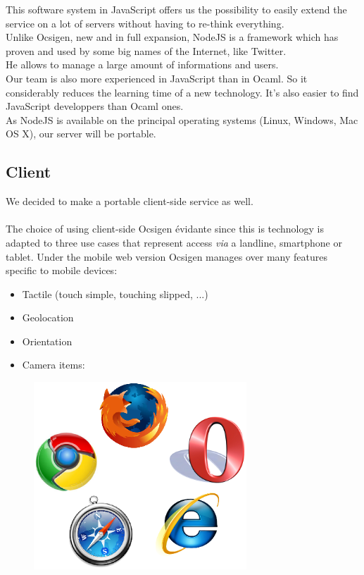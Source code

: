 \documentclass {life-en}
\begin{document}
This software system in JavaScript offers us the possibility to easily extend the service on a lot of servers without having to re-think everything.\\

Unlike Ocsigen, new and in full expansion, NodeJS is a framework which has proven and used by some big names of the Internet, like Twitter.\\
He allows to manage a large amount of informations and users.\\

Our team is also more experienced in JavaScript than in Ocaml. So it considerably reduces the learning time of a new technology. It's also easier to find JavaScript developpers than Ocaml ones.\\

As NodeJS is available on the principal operating systems (Linux, Windows, Mac OS X), our server will be portable.

\subsection{Client}

We decided to make a portable client-side service as well.\\
\\
The choice of using client-side Ocsigen évidante since this is 
technology is adapted to three use cases that represent access
\textit{via} a landline, smartphone or tablet. Under
the mobile web version Ocsigen manages over many features 
specific to mobile devices:
\begin{itemize}
  \item Tactile (touch simple, touching slipped, ...)
  \item Geolocation
  \item Orientation
  \item Camera
  items:
\end{itemize}

\begin{figure} [H]
  \begin{center}
    \includegraphics [width = 8cm]{img/browsers.png}
  \end{center}
\end{figure}
\end{document}
